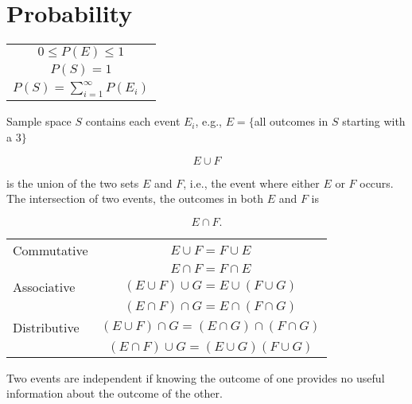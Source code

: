 \section{Probability}


\begin{center}
  \begin{tabular}{c}
    $0 \leq P(E) \leq 1$ \\
    $P(S) = 1$ \\
    $P(S) = \sum_{i=1}^{\infty} P(E_i)$ \\
  \end{tabular}
\end{center}

Sample space $S$ contains each event $E_i$, e.g., $E = \{$all outcomes in $S$ starting with a $3\}$

\hformbar




\begin{equation}
	E \cup F
\end{equation}

is the union of the two sets $E$ and $F$, i.e., the event where either $E$ or $F$ occurs. The intersection of two events, the outcomes in both $E$ and $F$ is

\begin{equation}
	E \cap F.
\end{equation}

\begin{center}
  \begin{tabular}{lc}
    Commutative  & $E \cup F = F \cup E$ \\
                 & $E \cap F = F \cap E$ \\
    Associative  & $(E \cup F) \cup G = E \cup (F \cup G) $ \\
                 & $(E \cap F) \cap G = E \cap (F \cap G)$ \\
    Distributive & $(E \cup F) \cap G = (E \cap G) \cap (F \cap G)$  \\
                 & $(E \cap F) \cup G = (E \cup G)(F \cup G)$
  \end{tabular}
\end{center}
\hformbar






Two events are independent if knowing the outcome of one provides no useful information about the outcome of the other.
\hformbar


